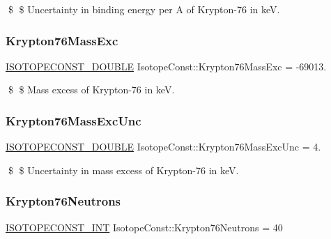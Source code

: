 \$ \$ Uncertainty in binding energy per A of Krypton-\/76 in keV. \mbox{\label{group___isotope_const-_krypton-_kr76_gaa1b3eb0c309c3c284b75c4cb695079c9}} 
\subsubsection{\texorpdfstring{Krypton76\+Mass\+Exc}{Krypton76MassExc}}
{\footnotesize\ttfamily \mbox{\hyperlink{group___isotope_const-_macros_ga8f45a7272ce02c0b4c65c44636ed719a}{I\+S\+O\+T\+O\+P\+E\+C\+O\+N\+S\+T\+\_\+\+D\+O\+U\+B\+LE}} Isotope\+Const\+::\+Krypton76\+Mass\+Exc = -\/69013.}

\$ \$ Mass excess of Krypton-\/76 in keV. \mbox{\label{group___isotope_const-_krypton-_kr76_gac6f70ae7a62c4a26db76a1baed57335e}} 
\subsubsection{\texorpdfstring{Krypton76\+Mass\+Exc\+Unc}{Krypton76MassExcUnc}}
{\footnotesize\ttfamily \mbox{\hyperlink{group___isotope_const-_macros_ga8f45a7272ce02c0b4c65c44636ed719a}{I\+S\+O\+T\+O\+P\+E\+C\+O\+N\+S\+T\+\_\+\+D\+O\+U\+B\+LE}} Isotope\+Const\+::\+Krypton76\+Mass\+Exc\+Unc = 4.}

\$ \$ Uncertainty in mass excess of Krypton-\/76 in keV. \mbox{\label{group___isotope_const-_krypton-_kr76_gaee1eb11945dacb1aeab3ae4efb5daec1}} 
\subsubsection{\texorpdfstring{Krypton76\+Neutrons}{Krypton76Neutrons}}
{\footnotesize\ttfamily \mbox{\hyperlink{group___isotope_const-_macros_ga5f18360b3e99483a35c32d789e62621c}{I\+S\+O\+T\+O\+P\+E\+C\+O\+N\+S\+T\+\_\+\+I\+NT}} Isotope\+Const\+::\+Krypton76\+Neutrons = 40}

